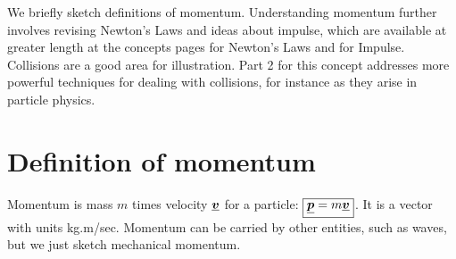 



\addtolength{\topmargin}{-0.7 cm}
\setlength{\columnsep}{22pt}
\nll
We briefly sketch definitions of momentum.  Understanding momentum further involves revising Newton's Laws and ideas about impulse, which are available at greater length at the concepts pages for Newton's Laws and for Impulse.  Collisions are a good area for illustration.  Part 2 for this concept addresses more powerful techniques for dealing with collisions, for instance as they arise in particle physics.

\section{Definition of momentum}
Momentum is mass $m$ times velocity $\mathit{\underline{\boldsymbol{v}}}$ for a particle: $\boxed{\mathit{\underline{\boldsymbol{p}}} = m \mathit{\underline{\boldsymbol{v}}}}$.\nll
It is a vector with units kg.m/sec.  Momentum can be carried by other entities, such as waves, but we just sketch mechanical momentum.

